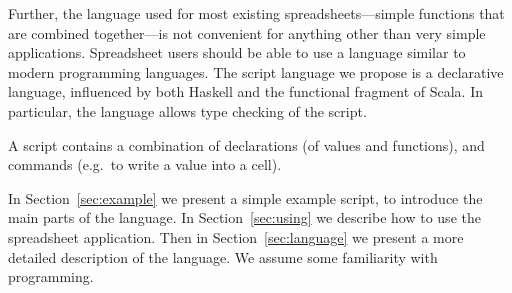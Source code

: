 Further, the language used for most existing spreadsheets---simple functions
that are combined together---is not convenient for anything other than very
simple applications.  Spreadsheet users should be able to use a language
similar to modern programming languages. 
%
The script language we propose is a declarative language, influenced by both
Haskell and the functional fragment of Scala.  In particular, the language
allows type checking of the script.

A script contains a combination of declarations (of values and functions), and
commands (e.g.~to write a value into a cell). 

In Section~\ref{sec:example} we present a simple example script, to introduce
the main parts of the language.  In Section~\ref{sec:using} we describe how
to use the spreadsheet application.   Then in Section~\ref{sec:language} we
present a more detailed description of the language.  We assume some
familiarity with programming. 
